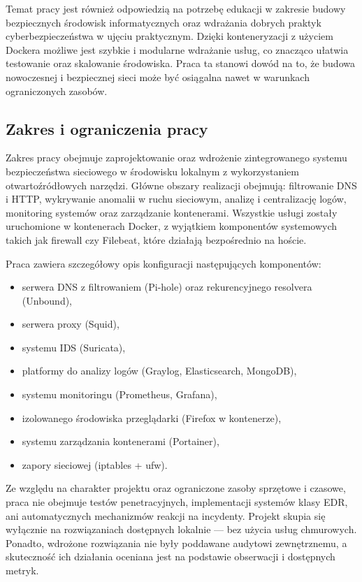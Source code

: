 \documentclass[
    left=2.5cm,         %
    right=2.5cm,        %
    top=2.5cm,          %
    bottom=3cm,         %
    bindingoffset=6mm,  %
    nohyphenation=true %
]{eiti/eiti-thesis} %
\begin{document}
Temat pracy jest również odpowiedzią na potrzebę edukacji w zakresie budowy bezpiecznych środowisk informatycznych oraz wdrażania dobrych praktyk cyberbezpieczeństwa w ujęciu praktycznym. Dzięki konteneryzacji z użyciem Dockera możliwe jest szybkie i modularne wdrażanie usług, co znacząco ułatwia testowanie oraz skalowanie środowiska. Praca ta stanowi dowód na to, że budowa nowoczesnej i bezpiecznej sieci może być osiągalna nawet w warunkach ograniczonych zasobów.

\subsection{Zakres i ograniczenia pracy}

Zakres pracy obejmuje zaprojektowanie oraz wdrożenie zintegrowanego systemu bezpieczeństwa sieciowego w środowisku lokalnym z wykorzystaniem otwartoźródłowych narzędzi. Główne obszary realizacji obejmują: filtrowanie DNS i HTTP, wykrywanie anomalii w ruchu sieciowym, analizę i centralizację logów, monitoring systemów oraz zarządzanie kontenerami. Wszystkie usługi zostały uruchomione w kontenerach Docker, z wyjątkiem komponentów systemowych takich jak firewall czy Filebeat, które działają bezpośrednio na hoście.

Praca zawiera szczegółowy opis konfiguracji następujących komponentów:
\begin{itemize}
    \item serwera DNS z filtrowaniem (Pi-hole) oraz rekurencyjnego resolvera (Unbound),
    \item serwera proxy (Squid),
    \item systemu IDS (Suricata),
    \item platformy do analizy logów (Graylog, Elasticsearch, MongoDB),
    \item systemu monitoringu (Prometheus, Grafana),
    \item izolowanego środowiska przeglądarki (Firefox w kontenerze),
    \item systemu zarządzania kontenerami (Portainer),
    \item zapory sieciowej (iptables + ufw).
\end{itemize}

Ze względu na charakter projektu oraz ograniczone zasoby sprzętowe i czasowe, praca nie obejmuje testów penetracyjnych, implementacji systemów klasy EDR, ani automatycznych mechanizmów reakcji na incydenty. Projekt skupia się wyłącznie na rozwiązaniach dostępnych lokalnie — bez użycia usług chmurowych. Ponadto, wdrożone rozwiązania nie były poddawane audytowi zewnętrznemu, a skuteczność ich działania oceniana jest na podstawie obserwacji i dostępnych metryk.
\end{document}
